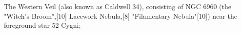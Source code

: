 The Western Veil (also known as Caldwell 34), consisting of NGC 6960 (the "Witch's Broom",[10] Lacework Nebula,[8] "Filamentary Nebula"[10]) near the foreground star 52 Cygni;
